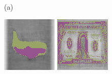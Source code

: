 \documentclass{article}
\begin{document}
\begin{figure}[t]
  \centering
  \begin{minipage}[c]{.1\linewidth}
    \centering\centerline{(a)}
  \end{minipage}
  \begin{minipage}[c]{.21\linewidth}
    \centering\centerline{\includegraphics[width=\linewidth]{imgs/dennis_cal/airplane/products/100.png}}
  \end{minipage}
  \begin{minipage}[c]{.21\linewidth}
    \centering\centerline{\includegraphics[width=\linewidth]{imgs/dennis_cal/dollar/products/100.png}}

\end{minipage}
\end{figure}
\end{document}

